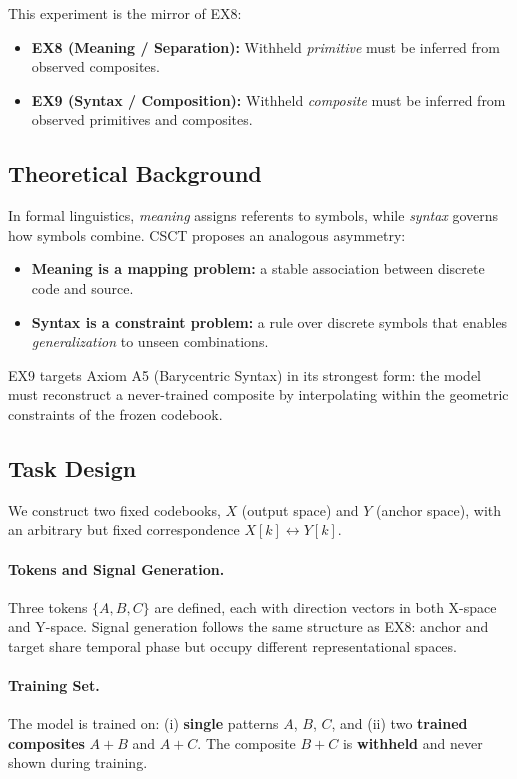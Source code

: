 \documentclass{article}
\begin{document}
This experiment is the mirror of EX8:
\begin{itemize}
    \item \textbf{EX8 (Meaning / Separation):} Withheld \emph{primitive} must be inferred from observed composites.
    \item \textbf{EX9 (Syntax / Composition):} Withheld \emph{composite} must be inferred from observed primitives and composites.
\end{itemize}

\subsection{Theoretical Background}
In formal linguistics, \emph{meaning} assigns referents to symbols, while \emph{syntax} governs how symbols combine.
CSCT proposes an analogous asymmetry:
\begin{itemize}
    \item \textbf{Meaning is a mapping problem:} a stable association between discrete code and source.
    \item \textbf{Syntax is a constraint problem:} a rule over discrete symbols that enables \emph{generalization} to unseen combinations.
\end{itemize}

EX9 targets Axiom A5 (Barycentric Syntax) in its strongest form: the model must reconstruct a never-trained composite by interpolating within the geometric constraints of the frozen codebook.

\subsection{Task Design}
We construct two fixed codebooks, $X$ (output space) and $Y$ (anchor space), with an arbitrary but fixed correspondence $X[k] \leftrightarrow Y[k]$.

\paragraph{Tokens and Signal Generation.}
Three tokens $\{A, B, C\}$ are defined, each with direction vectors in both X-space and Y-space.
Signal generation follows the same structure as EX8: anchor and target share temporal phase but occupy different representational spaces.

\paragraph{Training Set.}
The model is trained on:
(i) \textbf{single} patterns $A$, $B$, $C$, and
(ii) two \textbf{trained composites} $A{+}B$ and $A{+}C$.
The composite $B{+}C$ is \textbf{withheld} and never shown during training.
\end{document}
